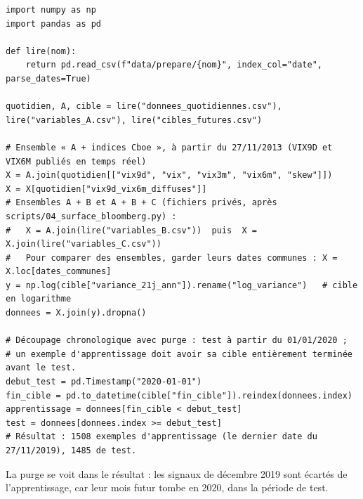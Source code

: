 \documentclass[10pt,a4paper]{article}
\begin{document}
\begin{tcolorbox}[enhanced,breakable,colback=marine!4,colframe=marine!25,boxrule=0.5pt,arc=2pt,left=6pt,top=2pt,bottom=2pt,fontupper=\footnotesize,
  title={\faIcon{code}\enspace Exemple testé : charger les données, construire « A + indices Cboe », découper avec purge},fonttitle=\small\bfseries,coltitle=marine,colbacktitle=marine!4,titlerule=0pt,bottomtitle=0pt]
\begin{verbatim}
import numpy as np
import pandas as pd

def lire(nom):
    return pd.read_csv(f"data/prepare/{nom}", index_col="date", parse_dates=True)

quotidien, A, cible = lire("donnees_quotidiennes.csv"), lire("variables_A.csv"), lire("cibles_futures.csv")

# Ensemble « A + indices Cboe », à partir du 27/11/2013 (VIX9D et VIX6M publiés en temps réel)
X = A.join(quotidien[["vix9d", "vix", "vix3m", "vix6m", "skew"]])
X = X[quotidien["vix9d_vix6m_diffuses"]]
# Ensembles A + B et A + B + C (fichiers privés, après scripts/04_surface_bloomberg.py) :
#   X = A.join(lire("variables_B.csv"))  puis  X = X.join(lire("variables_C.csv"))
#   Pour comparer des ensembles, garder leurs dates communes : X = X.loc[dates_communes]
y = np.log(cible["variance_21j_ann"]).rename("log_variance")   # cible en logarithme
donnees = X.join(y).dropna()

# Découpage chronologique avec purge : test à partir du 01/01/2020 ;
# un exemple d'apprentissage doit avoir sa cible entièrement terminée avant le test.
debut_test = pd.Timestamp("2020-01-01")
fin_cible = pd.to_datetime(cible["fin_cible"]).reindex(donnees.index)
apprentissage = donnees[fin_cible < debut_test]
test = donnees[donnees.index >= debut_test]
# Résultat : 1508 exemples d'apprentissage (le dernier date du 27/11/2019), 1485 de test.
\end{verbatim}
\end{tcolorbox}
La purge se voit dans le résultat : les signaux de décembre 2019 sont écartés de l'apprentissage, car leur mois futur tombe en 2020, dans la période de test.
\end{document}
